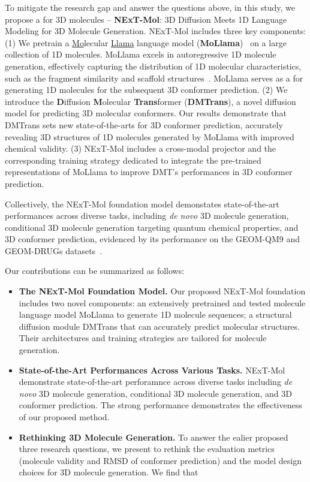 To mitigate the research gap and answer the questions above, in this study, we propose a  for 3D molecules -- \textbf{NExT-Mol}: 3D Diffusion Meets 1D Language Modeling for 3D Molecule Generation. NExT-Mol includes three key components: (1) We pretrain a \underline{Mo}lecular \underline{Llama} language model (\textbf{MoLlama})~\citep{Llama-2,zhang2024tinyllama} on a large collection of  1D molecules. MoLlama excels in autoregressive 1D molecule generation, effectively capturing the distribution of 1D molecular characteristics, such as the fragment similarity and scaffold structures~\citep{moses}. MoLlama serves as a  for generating 1D molecules for the subsequent 3D conformer prediction. (2) We introduce the \textbf{D}iffusion \textbf{M}olecular \textbf{Trans}former (\textbf{DMTrans}), a novel diffusion model for predicting 3D molecular conformers. Our results demonstrate that DMTrans sets new state-of-the-arts for 3D conformer prediction, accurately revealing 3D structures of 1D molecules generated by MoLlama with improved chemical validity. (3) NExT-Mol includes a cross-modal projector and the corresponding training strategy dedicated to integrate the pre-trained representations of MoLlama to improve DMT's performances in 3D conformer prediction. 

Collectively, the NExT-Mol foundation model demonstates state-of-the-art performances across diverse tasks, including \textit{de novo} 3D molecule generation, conditional 3D molecule generation targeting quantum chemical properties, and 3D conformer prediction, evidenced by its performance on the GEOM-QM9 and GEOM-DRUGs datasets~\citep{GEOM}.

Our contributions can be summarized as follows:
\begin{itemize}[leftmargin=*]
\item \textbf{The NExT-Mol Foundation Model.} Our proposed NExT-Mol foundation includes two novel components: an extensively pretrained and tested molecule language model MoLlama to generate 1D molecule sequences; a structural diffusion module DMTrans that can accurately predict molecular structures. Their architectures and training strategies are tailored for molecule generation.
\item \textbf{State-of-the-Art Performances Across Various Tasks.} NExT-Mol demonstrate state-of-the-art perforamnce across diverse tasks including \textit{de novo} 3D molecule generation, conditional 3D molecule generation, and 3D conformer prediction. The strong performance demonstrates the effectiveness of our proposed method. 
\item \textbf{Rethinking 3D Molecule Generation.} To answer the ealier proposed three research questions, we present  to rethink the evaluation metrics (\eg molecule validity and RMSD of conformer prediction) and the model design choices for 3D molecule generation. We find that 
\end{itemize}
